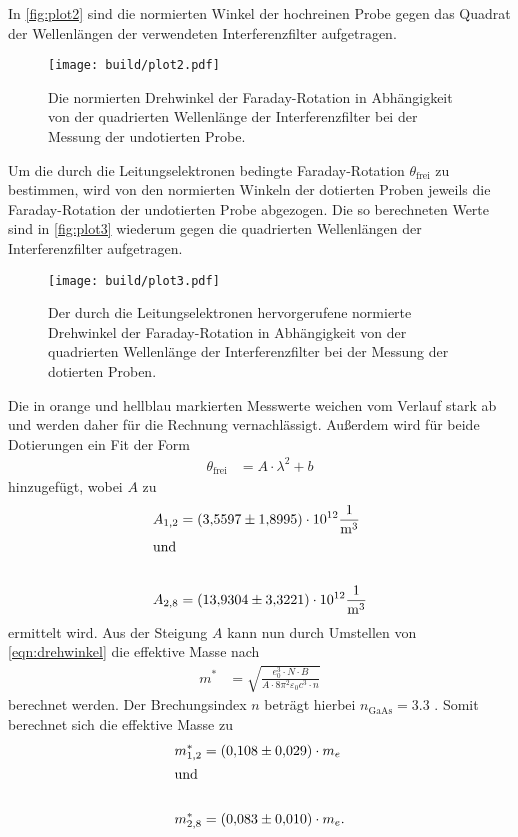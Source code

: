 In \autoref{fig:plot2} sind die normierten Winkel der hochreinen Probe gegen das Quadrat der Wellenlängen der verwendeten Interferenzfilter aufgetragen.
\begin{figure}[H]
  \centering
  \texttt{[image: build/plot2.pdf]}
  \caption {Die normierten Drehwinkel der Faraday-Rotation in Abhängigkeit von der quadrierten Wellenlänge der Interferenzfilter bei der Messung der undotierten Probe.}
  \label{fig:plot2}
\end{figure}

Um die durch die Leitungselektronen bedingte Faraday-Rotation $\theta_{\text{frei}}$ zu bestimmen, wird von den normierten Winkeln der dotierten Proben jeweils
die Faraday-Rotation der undotierten Probe abgezogen.
Die so berechneten Werte sind in \autoref{fig:plot3}
wiederum gegen die quadrierten Wellenlängen der Interferenzfilter aufgetragen.
\begin{figure}[H]
  \centering
  \texttt{[image: build/plot3.pdf]}
  \caption {Der durch die Leitungselektronen hervorgerufene normierte Drehwinkel der Faraday-Rotation in Abhängigkeit von der quadrierten Wellenlänge der Interferenzfilter bei der Messung der dotierten Proben.}
  \label{fig:plot3}
\end{figure}
Die in orange und hellblau markierten Messwerte weichen vom Verlauf stark ab und werden daher für die Rechnung vernachlässigt.
Außerdem wird für beide Dotierungen ein Fit der Form
\begin{align*}
  \theta_{\text{frei}} &= A \cdot \lambda^2+b
\end{align*}
hinzugefügt, wobei $A$ zu
\begin{align*}
  A_{1,2}&= \num{3.5597 \pm 1.8995 e12}\si{\per\cubic\metre}\\
  \shortintertext{und}\\
  A_{2,8}&= \num{13.9304 \pm 3.3221e12}\si{\per\cubic\metre}
\end{align*}
ermittelt wird.
Aus der Steigung $A$ kann nun durch Umstellen von \autoref{eqn:drehwinkel} die effektive Masse nach
\begin{align*}
  m^* &= \sqrt{\frac{e_0^3\cdot N \cdot B}{A\cdot 8\pi^2\varepsilon_0 c^3 \cdot n }} 
\end{align*}
berechnet werden.
Der Brechungsindex $n$ beträgt hierbei $n_{\text{GaAs}}=\num{3.3}$ \cite{BrechungsindexGaAs}.
Somit berechnet sich die effektive Masse zu
\begin{align*}
  m^*_{1,2}&=(\num{0.108 \pm 0.029}) \cdot m_e \\
  \shortintertext{und}\\
  m^*_{2,8}&=(\num{0.083 \pm 0.010})\cdot m_e.
\end{align*}